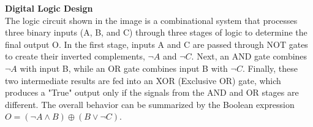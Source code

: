 \documentclass{article}
\begin{document}
\begin{enumerate}
\begin{minipage}[t]{0.52\textwidth}
\end{minipage}
\hfill
\begin{minipage}[t]{0.45\textwidth}
    \vspace{0pt}
    \textbf{Digital Logic Design}\\
    The logic circuit shown in the image is a combinational system that processes three binary inputs (A, B, and C) through three stages of logic to determine the final output O. In the first stage, inputs A and C are passed through NOT gates to create their inverted complements, $\neg A$ and $\neg C$. Next, an AND gate combines $\neg A$ with input B, while an OR gate combines input B with $\neg C$. Finally, these two intermediate results are fed into an XOR (Exclusive OR) gate, which produces a "True" output only if the signals from the AND and OR stages are different. The overall behavior can be summarized by the Boolean expression $O = (\neg A \land B) \oplus (B \lor \neg C)$.
\end{minipage}

\end{enumerate}
\end{document}
